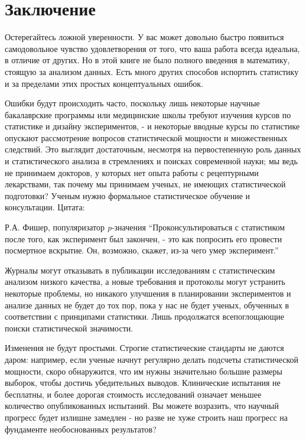 \chapter*{Заключение}
\label{chp13}

Остерегайтесь ложной уверенности. У вас может довольно быстро появиться самодовольное чувство удовлетворения от того, что ваша работа всегда идеальна, в отличие от других. Но в этой книге не было полного введения в математику, стоящую за анализом данных. Есть много других способов испортить статистику и за пределами этих простых концептуальных ошибок.

Ошибки будут происходить часто, поскольку лишь некоторые научные бакалаврские программы или медицинские школы требуют изучения курсов по статистике и дизайну экспериментов, - и некоторые вводные курсы по статистике опускают рассмотрение вопросов статистической мощности и множественных следствий. Это выглядит достаточным, несмотря на первостепенную роль данных и статистического анализа в стремлениях и поисках современной науки; мы ведь не принимаем докторов, у которых нет опыта работы с рецептурными лекарствами, так почему мы принимаем ученых, не имеющих статистической подготовки? Ученым нужно формальное статистическое обучение и консультации. Цитата:\\


\begin{chapquote}{Р.А. Фишер, популяризатор \emph{p}-значения}
``Проконсультироваться с статистиком после того, как эксперимент был закончен, - это как попросить его провести посмертное вскрытие. Он, возможно, скажет, из-за чего умер эксперимент.''
\end{chapquote} 

Журналы могут отказывать в публикации исследованиям с статистическим анализом низкого качества, а новые требования и протоколы могут устранить некоторые проблемы, но никакого улучшения в планировании экспериментов и анализе данных не будет до тох пор, пока у нас не будет ученых, обученных в соответствии с принципами статистики. Лишь продолжатся всепоглощающие поиски статистической значимости.

Изменения не будут простыми. Строгие статистические стандарты не даются даром: например, если ученые начнут регулярно делать подсчеты статистической мощности, скоро обнаружится, что им нужны значительно б\emph{о}льшие размеры выборок, чтобы достичь убедительных выводов. Клинические испытания не бесплатны, и более дорогая стоимость исследований означает меньшее количество опубликованных испытаний. Вы можете возразить, что научный прогресс будет излишне замедлен - но разве не хуже строить наш прогресс на фундаменте необоснованных результатов?

